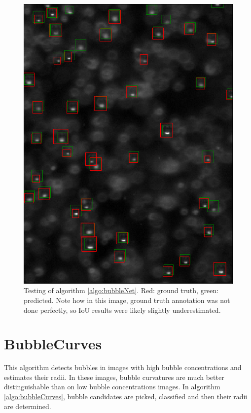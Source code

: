			\begin{figure}
				\centering
				\includegraphics[scale=0.8]{images/bubbleNet_validation_result.png}
				\caption{Testing of algorithm \ref{algo:bubbleNet}. Red: ground truth, green: predicted. Note how in this image, ground truth annotation was not done perfectly, so IoU results were likely slightly underestimated.}
				\label{fig:bubbleNet_result}
			\end{figure}
	
	
	
	
	
	
	\section{BubbleCurves}\label{BubbleCurves}
		This algorithm detects bubbles in images with high bubble concentrations and estimates their radii. In these images, bubble curvatures are much better distinguishable than on low bubble concentrations images. In algorithm \ref{algo:bubbleCurves}, bubble candidates are picked, classified and then their radii are determined.
	
